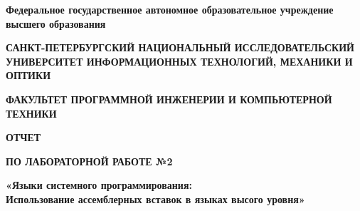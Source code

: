 \documentclass[12pt]{article}
\begin{document}
\setlength{\parindent}{0pt}
\pagestyle{empty}
\begin{center}
\normalsize
\textbf{Федеральное государственное автономное образовательное учреждение высшего образования}

\small
\medskip 
\textbf{САНКТ-ПЕТЕРБУРГСКИЙ НАЦИОНАЛЬНЫЙ ИССЛЕДОВАТЕЛЬСКИЙ  УНИВЕРСИТЕТ ИНФОРМАЦИОННЫХ ТЕХНОЛОГИЙ, МЕХАНИКИ И ОПТИКИ}

\medskip 
\textbf{ФАКУЛЬТЕТ ПРОГРАММНОЙ ИНЖЕНЕРИИ И КОМПЬЮТЕРНОЙ ТЕХНИКИ}
\end{center}
\bigskip\bigskip\bigskip\bigskip\bigskip\bigskip\bigskip\bigskip\bigskip\bigskip\bigskip\bigskip
\begin{center}
\par\medskip\par\smallskip
\Large
 
\par\smallskip
\textbf{ОТЧЕТ} 

\textbf{ПО ЛАБОРАТОРНОЙ РАБОТЕ №2}

\large
\par\bigskip
\textbf{«Языки системного программирования: \\ Использование ассемблерных вставок в языках высого уровня»}
\par\bigskip\par\bigskip\par\bigskip\par\bigskip\par\bigskip\par\bigskip
\par\bigskip\par\bigskip\par\bigskip\par\bigskip\par\bigskip\par\bigskip
\par\bigskip\par\bigskip\par\bigskip\par\bigskip\par\bigskip\par\bigskip
\end{center}
\end{document}
